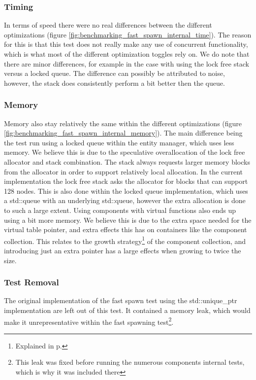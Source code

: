 \subsubsection{Timing}
In terms of speed there were no real differences between the different optimizations (figure \ref{fig:benchmarking_fast_spawn_internal_time}).
The reason for this is that this test does not really make any use of concurrent functionality,
which is what most of the different optimization toggles rely on.
We do note that there are minor differences, for example in the case with using the lock free
stack versus a locked queue. The difference can possibly be attributed to noise, however,
the stack does consistently perform a bit better then the queue.

\subsubsection{Memory}
Memory also stay relatively the same within the different optimizations (figure \ref{fig:benchmarking_fast_spawn_internal_memory}).
The main difference being the test run using a locked queue within the entity manager, which uses less memory.
We believe this is due to the speculative overallocation of the lock free allocator and stack combination.
The stack always requests larger memory blocks from the allocator in order to support relatively local allocation.
In the current implementation the lock free stack asks the allocator for blocks that can support 128 nodes.
This is also done within the locked queue implementation, which uses a std::queue with an underlying std::queue,
however the extra allocation is done to such a large extent.
Using components with virtual functions also ends up using a bit more memory.
We believe this is due to the extra space needed for the virtual table pointer,
and extra effects this has on containers like the component collection.
This relates to the growth strategy\footnote{Explained in p.\pageref{par:detailed_component_collection_reallocation_growth}} of the component collection,
and introducing just an extra pointer has a large effects when growing to twice the size.

\subsubsection{Test Removal}
The original implementation of the fast spawn test using the std::unique\_ptr implementation are left out of this test.
It contained a memory leak, which would make it unrepresentative within the fast spawning test\footnote{This leak was fixed before running the numerous components internal tests, which is why it was included there}.
